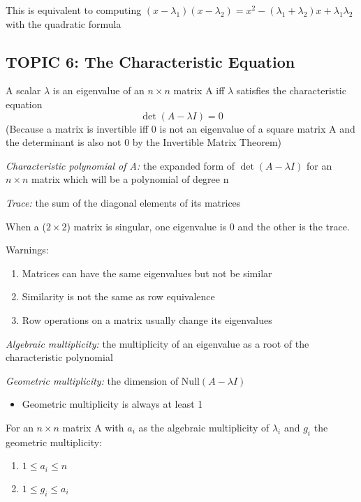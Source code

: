 \documentclass[12pt]{article} %
\begin{document}
This is equivalent to computing $(x - \lambda_1)(x - \lambda_2) = x^2 - (\lambda_1 + \lambda_2)x + \lambda_1 \lambda_2$ with the quadratic formula
\subsection{TOPIC 6: The Characteristic Equation}
A scalar $\lambda$ is an eigenvalue of an $n \times n$ matrix A iff $\lambda$ satisfies the characteristic equation 
$$\det (A - \lambda I) = 0$$
(Because a matrix is invertible iff 0 is not an eigenvalue of a square matrix A and the determinant is also not 0 by the Invertible Matrix Theorem)

\emph{Characteristic polynomial of A:} the expanded form of $\det(A-\lambda I)$ for an $n \times n$ matrix which will be a polynomial of degree n

\emph{Trace:} the sum of the diagonal elements of its matrices

When a ($2 \times 2$) matrix is singular, one eigenvalue is 0 and the other is the trace.

Warnings:
\begin{enumerate}
	\item Matrices can have the same eigenvalues but not be similar
	\item Similarity is not the same as row equivalence
	\item Row operations on a matrix usually change its eigenvalues
\end{enumerate}

\emph{Algebraic multiplicity:} the multiplicity of an eigenvalue as a root of the characteristic polynomial

\emph{Geometric multiplicity:} the dimension of $\text{Null}(A-\lambda I)$
\begin{itemize}
	\item Geometric multiplicity is always at least 1
\end{itemize}

For an $n \times n$ matrix A with $a_i$ as the algebraic multiplicity of $\lambda_i$ and $g_i$ the geometric multiplicity:
\begin{enumerate}
	\item $1 \leq a_i \leq n$
	\item $1 \leq g_i \leq a_i$
\end{enumerate}
\end{document}
